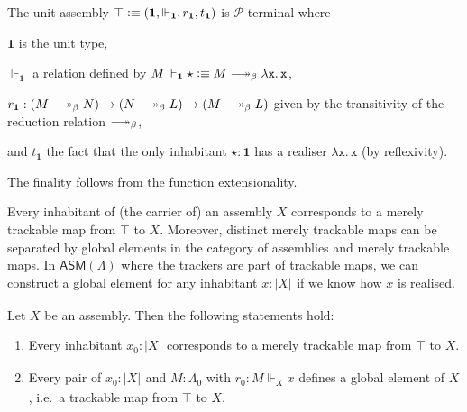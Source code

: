 \documentclass[a4paper,UKenglish,numberwithinsect,cleveref,thm-restate]{lipics-v2021}
\numberwithin{equation}{section}
\newcommand{\tproj}[3][]{\mathopen{}\left|#3\right|_{#2}^{#1}\mathclose{}}
\newcommand{\bproj}[1]{\tproj{}{#1}}
\newcommand{\PP}{\mathscr{P}}
\newcommand{\ASM}{\mathsf{ASM}}
\newcommand{\defeq}{\vcentcolon\equiv}
\newcommand{\Unit}{\mathbf{1}}
\DeclareRobustCommand\longtwoheadrightarrow{\relbar\joinrel\twoheadrightarrow}
\newcommand{\reduce}{\longtwoheadrightarrow_{\beta}}
\theoremstyle{plain}
\begin{document}
\begin{example}
  The unit assembly $\top \defeq (\Unit, \Vdash_{\Unit}, r_{\Unit}, t_{\Unit})$ is $\PP$-terminal where 
  \begin{romanenumerate}
    \item $\Unit$ is the unit type,  
    \item $\Vdash_{\Unit}$ a relation defined by $M \Vdash_{\Unit} \star \defeq M \reduce \mathtt{\lambda x.\, x}$, 
    \item $r_{\Unit}: (M \reduce N) \to (N \reduce L) \to (M \reduce L)$ given by the transitivity of the reduction relation $\reduce$,
    \item and $t_{\Unit}$ the fact that the only inhabitant $\star : \Unit$ has a realiser $\mathtt{\lambda x.\, x}$ (by reflexivity).
  \end{romanenumerate}
  The finality follows from the function extensionality.
\end{example}

Every inhabitant of (the carrier of) an assembly $X$ corresponds to a merely trackable map from $\top$ to $X$.
Moreover, distinct merely trackable maps can be separated by global elements in the category of assemblies and merely trackable maps. 
In $\ASM(\Lambda)$ where the trackers are part of trackable maps, we can construct a global element for any inhabitant $x : \bproj{X}$ if we know how $x$ is realised. 
\begin{lemma}\label{lem:global-elemnt}
  Let $X$ be an assembly. Then the following statements hold:
  \begin{enumerate}
    \item Every inhabitant $x_0 : \bproj{X}$ corresponds to a merely trackable map from $\top$ to $X$.
    \item Every pair of $x_0 : \bproj{X}$ and $M : \Lambda_0$ with $r_0 : M \Vdash_X x$ defines a global element of $X$, i.e.\ a trackable map from $\top$ to $X$.
  \end{enumerate}
\end{lemma}
\end{document}

